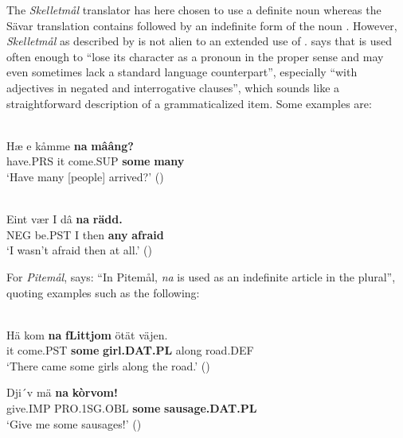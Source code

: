 \z

The \textit{Skelletmål} translator has here chosen to use a definite noun whereas the Sävar translation contains followed by an indefinite form of the noun . However, \textit{Skelletmål} as described by \citet{Marklund1976} is not alien to an extended use of . \citet[43]{Marklund1976} says that  is used often enough to “lose its character as a pronoun in the proper sense and may even sometimes lack a standard language counterpart”, especially “with adjectives in negated and interrogative clauses”, which sounds like a straightforward description of a grammaticalized item. Some examples are:

\ea \label{} 
\\
\gll Hæ  e  kåmme  \textbf{na} \textbf{  mââng?}\\
have.PRS  it  come.SUP  \textbf{some} \textbf{many}\\
\glt ‘Have many [people] arrived?’ (\citet[43]{Marklund1976})

\z

\ea \label{} 
\\
\gll Eint  vær  I  dâ  \textbf{na} \textbf{rädd.}\\
NEG  be.PST  I  then  \textbf{any} \textbf{afraid}\\
\glt ‘I wasn’t afraid then at all.’ (\citet[43]{Marklund1976})

\z

For \textit{Pitemål}, \citet[19]{Brännström1993} says: “In Pitemål, \textit{na} is used as an indefinite article in the plural”, quoting examples such as the following:

\ea\label{}
\\
\gll Hä  kom  \textbf{na} \textbf{  fLi{\textasciigrave}ttjom} ötät  väjen.\\
it  come.PST  \textbf{some} \textbf{girl.DAT.PL} along  road.DEF\\
\glt ‘There came some girls along the road.’ (\citet[19]{Brännström1993})

\z

\ea
\gll Dji´v  mä  \textbf{na} \textbf{  kòrvom!}\\
give.IMP  PRO.1SG.OBL  \textbf{some} \textbf{sausage.DAT.PL}\\
\glt ‘Give me some sausages!’ (\citet[19]{Brännström1993})

